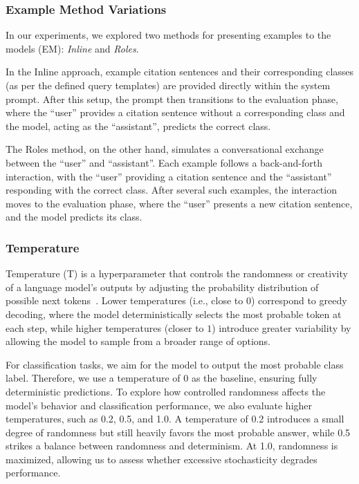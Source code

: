 \subsubsection{Example Method Variations}\label{sec:example_method_variations}

In our experiments, we explored two methods for presenting examples to the models (EM): \emph{Inline} and \emph{Roles}.

In the Inline approach, example citation sentences and their corresponding classes (as per the defined query templates) are provided directly within the system prompt. After this setup, the prompt then transitions to the evaluation phase, where the ``user'' provides a citation sentence without a corresponding class and the model, acting as the ``assistant'', predicts the correct class.

The Roles method, on the other hand, simulates a conversational exchange between the ``user'' and ``assistant''.
Each example follows a back-and-forth interaction, with the ``user'' providing a citation sentence and the ``assistant'' responding with the correct class. 
After several such examples, the interaction moves to the evaluation phase, where the ``user'' presents a new citation sentence, and the model predicts its class.


\subsubsection{Temperature}\label{sec:temperature}

Temperature (T) is a hyperparameter that controls the randomness or creativity of a language model's outputs by adjusting the probability distribution of possible next tokens~\citep{jm3}. Lower temperatures (i.e., close to $0$) correspond to greedy decoding, where the model deterministically selects the most probable token at each step, while higher temperatures (closer to $1$) introduce greater variability by allowing the model to sample from a broader range of options.

For classification tasks, we aim for the model to output the most probable class label. 
Therefore, we use a temperature of $0$ as the baseline, ensuring fully deterministic predictions. 
To explore how controlled randomness affects the model's behavior and classification performance, we also evaluate higher temperatures, such as 0.2, 0.5, and 1.0.
A temperature of 0.2 introduces a small degree of randomness but still heavily favors the most probable answer, while 0.5 strikes a balance between randomness and determinism. At 1.0, randomness is maximized, allowing us to assess whether excessive stochasticity degrades performance.

